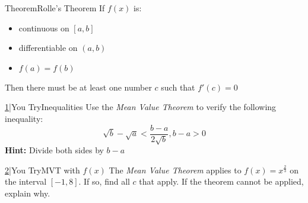 \documentclass{MathNotes}
\newenvironment{theorem}[1]{\begin{GrayBox}{Theorem}{#1}}{\end{GrayBox}}
\newenvironment{practice}[2]{\begin{PurpleBox}{\texorpdfstring{#1}\Big|You Try}{#2}}{\end{PurpleBox}}
\begin{document}
\begin{multicols}{2}
\begin{center}
\end{center}
\begin{theorem}{Rolle's Theorem}
    If $f(x)$ is:
    \begin{itemize}
        \item continuous on $[a, b]$
        \item differentiable on $(a, b)$
        \item $f(a)=f(b)$
    \end{itemize}
    Then there must be at least one number $c$ such that $f'(c)=0$
\end{theorem}
\end{multicols}
\begin{multicols}{2}
\begin{practice}{\hyperref[ans:3.2-1]{1}}{Inequalities}\label{prac:3.2-1}
    Use the \textit{Mean Value Theorem} to verify the following inequality:
    $$\sqrt{b}-\sqrt{a}<\frac{b-a}{2\sqrt{b}},b-a>0$$
    \textbf{Hint:} Divide both sides by $b-a$
\end{practice}
\begin{practice}{\hyperref[ans:3.2-2]{2}}{MVT with $f(x)$}\label{prac:3.2-2}
    The \textit{Mean Value Theorem} applies to $f(x)=x^{\frac{2}{3}}$ on the 
    interval $[-1, 8]$. If so, find all $c$ that apply. If the theorem cannot
    be applied, explain why.
\end{practice}
\end{multicols}
\end{document}
